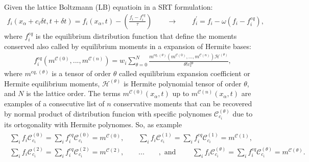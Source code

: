 \documentclass[letterpaper,10pt,english,openany,oneside]{jupyterBook}
\begin{document}
\sphinxAtStartPar
Given the lattice Boltzmann (LB) equatioin in a SRT formulation:
\begin{equation}\label{equation:Refs/LBM-Study/FDM-Belloti/General-FDM-Single-Relaxation:LB-fdm-df-Eq}
\begin{split}
f_i( x_{\alpha} + c_{i} \delta t, t+\delta t) = f_i(x_{\alpha}, t)  -\left( \frac{ f_{i} - f_{i}^{eq} }{ \tau } \right) \qquad \rightarrow \qquad f_i^{'} = f_i  - \omega\left( f_{i} - f_{i}^{eq} \right), 
\end{split}
\end{equation}
\sphinxAtStartPar
where \(f^{eq}_{i}\) is the equilibrium distribution function that define the moments conserved also called by equilibrium moments in a expansion of Hermite bases:
\begin{equation}\label{equation:Refs/LBM-Study/FDM-Belloti/General-FDM-Single-Relaxation:general-df-fdm-feq-Eq}
\begin{split}
f^{eq}_{i}\left(m^{\mathcal{C}(0)},...,m^{\mathcal{C}(n)}\right)=w_{i}\displaystyle\sum_{\theta=0}^{N} \displaystyle\frac{ m^{eq,(\theta)}\left(m^{\mathcal{C}(0)},...,m^{\mathcal{C}(n)}\right)\mathcal{H}^{(\theta)} }{\theta! c_{s}^{2\theta} },
\end{split}
\end{equation}
\sphinxAtStartPar
where \(m^{eq,(\theta)}\) is a tensor of order \(\theta\) called equilibrium expansion coefficient or Hermite equilibrium moments, \(\mathcal{H}^{(\theta)}\) is Hermite polynomial tensor of order \(\theta\), and \(N\) is the lattice order. The terms \(m^{\mathcal{C}(0)}(x_{\alpha}, t)\) up to \(m^{\mathcal{C}(n)}(x_{\alpha}, t)\) are examples of a consecutive list of \(n\) conservative moments that can be recovered by normal product of distribution funcion with specific polynomes \(\mathcal{C}_{c_{i}}^{(\theta)}\) due to its ortogonality with Hermite polynomes. So, as example
\begin{equation}\label{equation:Refs/LBM-Study/FDM-Belloti/General-FDM-Single-Relaxation:general-conserved-moments-fdm-fi-df}
\begin{split}
\begin{array}{c}
\sum_{i}f_{i}\mathcal{C}_{c_{i}}^{(0)}=\displaystyle\sum_{i}f_{i}^{eq}\mathcal{C}_{c_{i}}^{(0)}=m^{\mathcal{C}(0)}, \qquad \sum_{i}f_{i}\mathcal{C}_{c_{i}}^{(1)}=\displaystyle\sum_{i}f_{i}^{eq}\mathcal{C}_{c_{i}}^{(1)}=m^{\mathcal{C}(1)},\\
\sum_{i}f_{i}\mathcal{C}_{c_{i}}^{(2)}=\displaystyle\sum_{i}f_{i}^{eq}\mathcal{C}_{c_{i}}^{(2)}=m^{\mathcal{C}(2)}, \qquad ... \qquad, \textrm{ and } \qquad \sum_{i}f_{i}\mathcal{C}_{c_{i}}^{(\theta)}=\displaystyle\sum_{i}f_{i}^{eq}\mathcal{C}_{c_{i}}^{(\theta)}=m^{\mathcal{C}(\theta)}. 
\end{array}
\end{split}
\end{equation}
\end{document}
